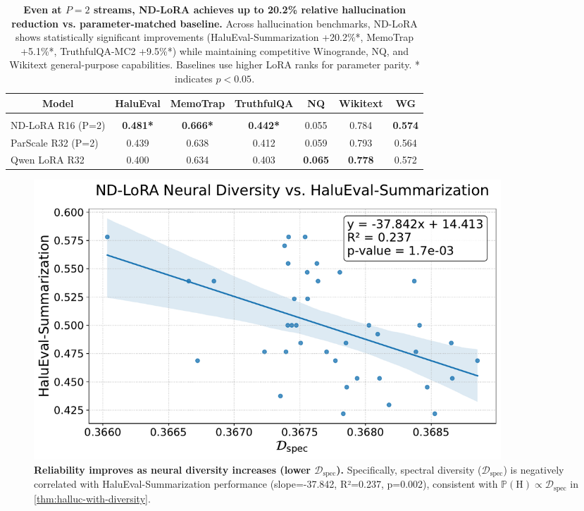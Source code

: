 \documentclass{article} %
\begin{document}
\begin{table}[t]
  \begin{center}
    \begin{tabular}{lcccccc}
      \multicolumn{1}{c}{\bf Model} &
      \multicolumn{1}{c}{\bf HaluEval} &
      \multicolumn{1}{c}{\bf MemoTrap} &
      \multicolumn{1}{c}{\bf TruthfulQA} &
      \multicolumn{1}{c}{\bf NQ} &
      \multicolumn{1}{c}{\bf Wikitext} &
      \multicolumn{1}{c}{\bf WG}
      \\ \hline \\[-0.75em]
      ND-LoRA R16 (P=2)        & \textbf{0.481*} & \textbf{0.666*} & \textbf{0.442*} & 0.055 & 0.784 & \textbf{0.574} \\
      ParScale R32 (P=2)       & 0.439 & 0.638 & 0.412 & 0.059 & 0.793 & 0.564 \\
      Qwen LoRA R32            & 0.400 & 0.634 & 0.403 & \textbf{0.065} & \textbf{0.778} & 0.572 \\
    \end{tabular}
  \end{center}
  \caption{
    \textbf{Even at $P=2$ streams, ND-LoRA achieves up to 20.2\% relative hallucination reduction vs.
    parameter-matched baseline.} Across hallucination benchmarks, ND-LoRA shows statistically
    significant improvements (HaluEval-Summarization +20.2\%*, MemoTrap +5.1\%*, TruthfulQA-MC2 +9.5\%*)
    while maintaining competitive Winogrande, NQ, and Wikitext general-purpose capabilities. Baselines use higher
    LoRA ranks for parameter parity. * indicates $p < 0.05$.
  }
  \label{tab:relacc}
\end{table}

\begin{figure}[t]
  \begin{center}
    \includegraphics[width=0.85\textwidth]{assets/figure3_correlational_intuition.pdf}
  \end{center}
  \caption{
    \textbf{Reliability improves as neural diversity increases (lower $\mathcal{D}_{\text{spec}}$).} Specifically,
    spectral diversity ($\mathcal{D}_{\text{spec}}$) is negatively correlated with HaluEval-Summarization
    performance (slope=-37.842, R²=0.237, p=0.002), consistent with $\mathbb{P}(\text{H}) \propto
    \mathcal{D}_{\text{spec}}$ in \autoref{thm:halluc-with-diversity}.
  }
  \label{fig:correlational}
\end{figure}
\end{document}
